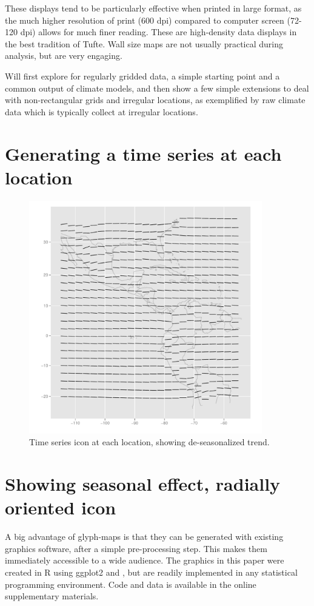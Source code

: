 \documentclass[oneside]{article}
\begin{document}
These displays tend to be particularly effective when printed in large format, as the much higher resolution of print (600 dpi) compared to computer  screen (72-120 dpi) allows for much finer reading. These are high-density data displays in the best tradition of Tufte. Wall size maps are not usually practical during analysis, but are very engaging.

Will first explore for regularly gridded data, a simple starting point and a common output of climate models, and then show a few simple extensions to deal with non-rectangular grids and irregular locations, as exemplified by raw climate data which is typically collect at irregular locations.
\section{Generating a time series at each location}

\begin{figure}[htp]
\centerline{\includegraphics[width=4in]{nasa-deseas-trend.pdf}}
\caption{Time series icon at each location, showing de-seasonalized trend.}
\end{figure}

\section{Showing seasonal effect, radially oriented icon}

A big advantage of glyph-maps is that they can be generated with existing graphics software, after a simple pre-processing step. This makes them immediately accessible to a wide audience. The graphics in this paper were created in R \citep{R} using ggplot2 \citep{me:ggplot2,wickham:2007d} and \citep{me:plyr}, but are readily implemented in any statistical programming environment.  Code and data is available in the online supplementary materials.
\end{document}
